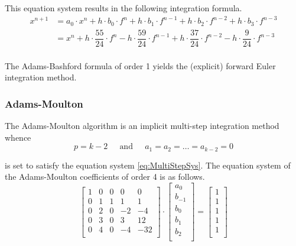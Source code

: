 This equation system results in the following integration formula.
\begin{equation}
\begin{split}
x^{n+1} &= a_0\cdot x^{n} + h\cdot b_{0}\cdot f^{n} + h\cdot b_{1}\cdot f^{n-1} + h\cdot b_{2}\cdot f^{n-2} + h\cdot b_{3}\cdot f^{n-3}\\
&= x^{n} + h\cdot \dfrac{55}{24}\cdot f^{n} - h\cdot \dfrac{59}{24}\cdot f^{n-1} + h\cdot \dfrac{37}{24}\cdot f^{n-2} - h\cdot \dfrac{9}{24}\cdot f^{n-3}\\
\end{split}
\end{equation}

The Adams-Bashford formula of order 1 yields the (explicit) forward
Euler integration method.

\subsubsection{Adams-Moulton}

The Adams-Moulton algorithm is an implicit multi-step integration
method whence
\begin{equation}
p = k - 2
\;\;\;\; \textrm{ and } \;\;\;\;
a_1 = a_2 = \ldots = a_{k-2} = 0
\end{equation}

is set to satisfy the equation system \eqref{eq:MultiStepSys}.  The
equation system of the Adams-Moulton coefficients of order 4 is as
follows.
\begin{equation}
\left[\begin{array}{lrrrr}
1 & 0 &  0 &   0 &    0\\
0 & 1 &  1 &   1 &    1\\
0 & 2 &  0 &  -2 &   -4\\
0 & 3 &  0 &   3 &   12\\
0 & 4 &  0 &  -4 &  -32\\
\end{array}\right]
\cdot
\begin{bmatrix}
a_0\\
b_{-1}\\
b_0\\
b_1\\
b_2\\
\end{bmatrix}
=
\begin{bmatrix}
1\\
1\\
1\\
1\\
1\\
\end{bmatrix}
\end{equation}

